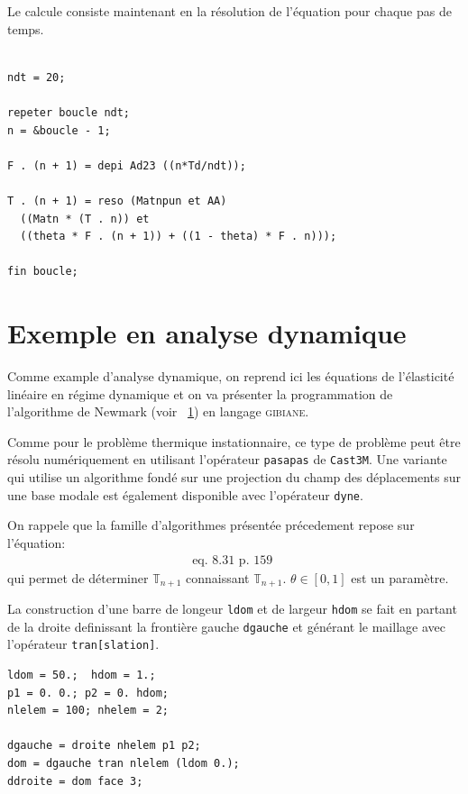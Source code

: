 \begin{castemcom}
Le calcule consiste maintenant en la résolution de l'équation 
pour chaque pas de temps. 
\end{castemcom}
\begin{castemlines}
\begin{verbatim}

ndt = 20;

repeter boucle ndt; 
n = &boucle - 1;

F . (n + 1) = depi Ad23 ((n*Td/ndt));

T . (n + 1) = reso (Matnpun et AA) 
  ((Matn * (T . n)) et 
  ((theta * F . (n + 1)) + ((1 - theta) * F . n))); 

fin boucle;  

\end{verbatim}
\end{castemlines}
 
\section{Exemple en analyse dynamique}

Comme example d'analyse dynamique, on reprend  ici les équations de 
l'élasticité linéaire en régime dynamique et on va présenter 
la programmation de l'algorithme de Newmark (voir ~\ref{}) 
en langage \textsc{gibiane}.

Comme pour le problème thermique instationnaire, ce type de problème peut être 
résolu numériquement en utilisant l'opérateur \texttt{pasapas} de \texttt{Cast3M}.
Une variante qui utilise un algorithme fondé sur une projection du champ des 
déplacements sur une base modale est également disponible 
avec l'opérateur \texttt{dyne}. 

On rappele que la famille d'algorithmes présentée précedement
repose sur l'équation:
\begin{eqnarray}
  \text{eq. 8.31 p. 159 }
\end{eqnarray} 
qui permet de déterminer $\mathbb{T}_{n+1}$ connaissant $\mathbb{T}_{n+1}$.
$\theta \in [0,1]$ est un paramètre. 

 
\begin{castemcom}
La construction d'une barre de longeur \texttt{ldom} et de 
largeur \texttt{hdom} se fait en partant de la droite definissant
la frontière gauche \texttt{dgauche} et générant le maillage avec
l'opérateur \texttt{tran[slation]}. 
\end{castemcom}
\begin{castemlines}
\begin{verbatim}
ldom = 50.;  hdom = 1.;
p1 = 0. 0.; p2 = 0. hdom;
nlelem = 100; nhelem = 2; 

dgauche = droite nhelem p1 p2; 
dom = dgauche tran nlelem (ldom 0.); 
ddroite = dom face 3;

\end{verbatim}
\end{castemlines}

